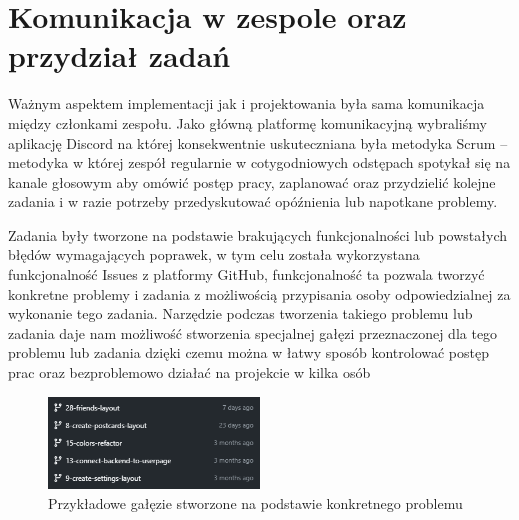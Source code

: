 \documentclass[a4paper,twoside,12pt]{book}
\begin{document}
\section{Komunikacja w zespole oraz przydział zadań}
Ważnym aspektem implementacji jak i projektowania była sama komunikacja między członkami zespołu. Jako główną platformę komunikacyjną wybraliśmy aplikację Discord na której konsekwentnie uskuteczniana była metodyka Scrum -- metodyka w której zespół regularnie w cotygodniowych odstępach spotykał się na kanale głosowym aby omówić postęp pracy, zaplanować oraz przydzielić kolejne zadania i w razie potrzeby przedyskutować opóźnienia lub napotkane problemy.

Zadania były tworzone na podstawie brakujących funkcjonalności lub powstałych błędów wymagających poprawek, w tym celu została wykorzystana funkcjonalność Issues z platformy GitHub, funkcjonalność ta pozwala tworzyć konkretne problemy i zadania z możliwością przypisania osoby odpowiedzialnej za wykonanie tego zadania. Narzędzie podczas tworzenia takiego problemu lub zadania daje nam możliwość stworzenia specjalnej gałęzi przeznaczonej dla tego problemu lub zadania dzięki czemu można w łatwy sposób kontrolować postęp prac oraz bezproblemowo działać na projekcie w kilka osób

\begin{figure}[H]
    \centering
    \includegraphics[width=0.5\textwidth]{github_ss/branche.png}
    \caption{Przykładowe gałęzie stworzone na podstawie konkretnego problemu}
\end{figure}
\newpage
\end{document}
